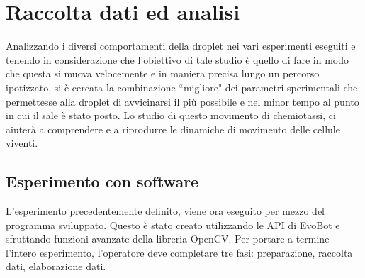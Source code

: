 \chapter{Raccolta dati ed analisi}
\vspace{0.5cm}
\label{cha:789}

Analizzando i diversi comportamenti della droplet nei vari esperimenti eseguiti e tenendo in considerazione che l'obiettivo di tale studio è quello di fare in modo che questa si muova velocemente e in maniera precisa lungo un percorso ipotizzato, si è cercata la combinazione ``migliore" dei parametri sperimentali che permettesse alla droplet di avvicinarsi il più possibile e nel minor tempo al punto in cui il sale è stato posto. Lo studio di questo movimento di chemiotassi, ci aiuterà a comprendere e a riprodurre le dinamiche di movimento delle cellule viventi.

\section{Esperimento con software}
L'esperimento precedentemente definito, viene ora eseguito per mezzo del programma sviluppato. Questo è stato creato utilizzando le API di EvoBot e sfruttando funzioni avanzate della libreria OpenCV.
Per portare a termine l'intero esperimento, l'operatore deve completare tre fasi: preparazione, raccolta dati, elaborazione dati. 


